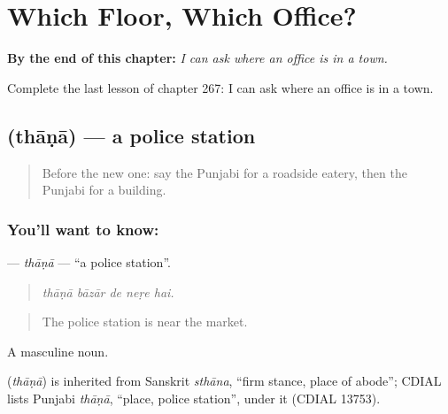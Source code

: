 
\chapter{Which Floor, Which Office?}
\label{ch:pa-a2-which-floor-which-office}

\begin{chapteropening}
\textbf{By the end of this chapter:} \emph{I can ask where an office is in a town.}

Complete the last lesson of chapter 267: I can ask where an office is in a town.
\end{chapteropening}

\section[\texorpdfstring{\pa{ਥਾਣਾ} (thāṇā)}{ਥਾਣਾ (thāṇā)}]{ (thāṇā) — a police station}

\label{lesson:PA-C267-thana}



\begin{quote}
Before the new one: say the Punjabi for a roadside eatery, then the Punjabi for a building.
\end{quote}

\subsection*{You'll want to know: }
\textbf{} — \emph{thāṇā} — \textquotedblleft{}a police station\textquotedblright{}.

\begin{quote}
    
\end{quote}

\begin{quote}
\emph{thāṇā bāzār de neṛe hai.}
\end{quote}

\begin{quote}
The police station is near the market.
\end{quote}

A masculine noun.

\begin{cousinweb}
\textbf{} (\emph{thāṇā}) is inherited from Sanskrit \emph{sthāna}, \textquotedblleft{}firm stance, place of abode\textquotedblright{}; CDIAL lists Punjabi \emph{thāṇā}, \textquotedblleft{}place, police station\textquotedblright{}, under it (CDIAL 13753).
\end{cousinweb}

